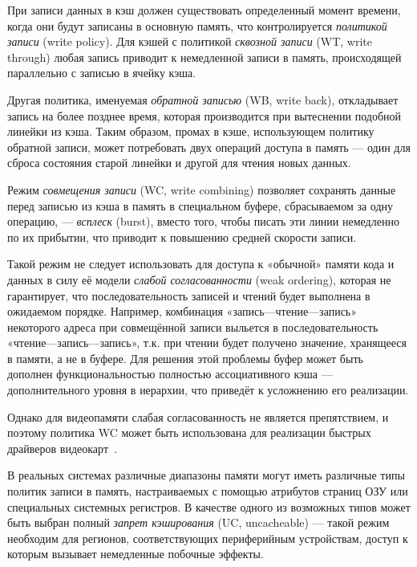 При записи данных в кэш должен существовать определенный момент времени, когда они будут записаны в основную память, что контролируется \textit{политикой записи} (\abbr write policy). Для кэшей с политикой \textit{сквозной записи} (WT, \abbr write through) любая запись приводит к немедленной записи в память, происходящей параллельно с записью в ячейку кэша. 

Другая политика, именуемая \textit{обратной записью} (WB, \abbr write back), откладывает запись на более позднее время, которая производится при вытеснении подобной линейки из кэша. Таким образом, промах в кэше, использующем политику обратной записи, может потребовать двух операций доступа в память --- один для сброса состояния старой линейки и другой для чтения новых данных.

Режим \textit{совмещения записи} (WC, \abbr write combining) позволяет сохранять данные перед записью из кэша в память в специальном буфере, сбрасываемом за одну операцию, --- \textit{всплеск} (\abbr burst), вместо того, чтобы  писать эти линии немедленно по их прибытии, что приводит к повышению средней скорости записи. %

Такой режим не следует использовать для доступа к «обычной» памяти кода и данных в силу её модели \textit{слабой согласованности} (\abbr weak ordering), которая не гарантирует, что последовательность записей и чтений будет выполнена в ожидаемом порядке. Например, комбинация «запись---чтение---запись» некоторого адреса при совмещённой записи выльется в последовательность «чтение---запись---запись», т.к. при чтении будет получено значение, хранящееся в памяти, а не в буфере. Для решения этой проблемы буфер может быть дополнен функциональностью полностью ассоциативного кэша --- дополнительного уровня в иерархии, что приведёт к усложнению его реализации.

Однако для видеопамяти слабая согласованность не является препятствием, и поэтому политика WC может быть использована для реализации быстрых драйверов видеокарт~\cite{wc-guidelines}.

В реальных системах различные диапазоны памяти могут иметь различные типы политик записи в память, настраиваемых с помощью атрибутов страниц ОЗУ или специальных системных регистров. В качестве одного из возможных типов может быть выбран полный \textit{запрет кэширования} (UC, \abbr uncacheable) --- такой режим необходим для регионов, соответствующих периферийным устройствам, доступ к которым вызывает немедленные побочные эффекты.

